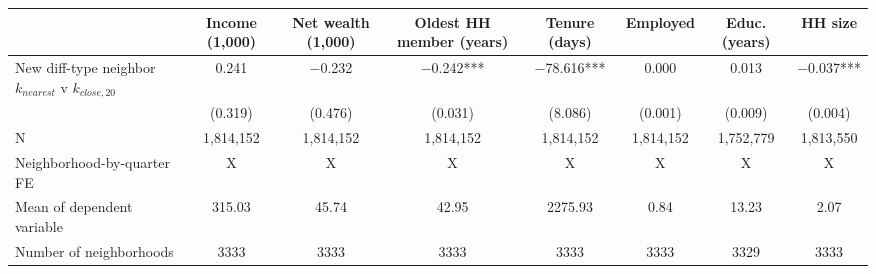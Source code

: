 \begin{tabular}[t]{lccccccc}
\toprule
  & Income (1,000) & Net wealth (1,000) & Oldest HH member (years) & Tenure (days) & Employed & Educ. (years) & HH size\\
\midrule
New diff-type neighbor $k_{nearest}$ v $k_{close,20}$ & \num{0.241} & \num{-0.232} & \num{-0.242}*** & \num{-78.616}*** & \num{0.000} & \num{0.013} & \num{-0.037}***\\
 & (\num{0.319}) & (\num{0.476}) & (\num{0.031}) & (\num{8.086}) & (\num{0.001}) & (\num{0.009}) & (\num{0.004})\\
\midrule
N & 1,814,152 & 1,814,152 & 1,814,152 & 1,814,152 & 1,814,152 & 1,752,779 & 1,813,550\\
Neighborhood-by-quarter FE & X & X & X & X & X & X & X\\
Mean of dependent variable & 315.03 & 45.74 & 42.95 & 2275.93 & 0.84 & 13.23 & 2.07\\
Number of neighborhoods & 3333 & 3333 & 3333 & 3333 & 3333 & 3329 & 3333\\
\bottomrule
\end{tabular}